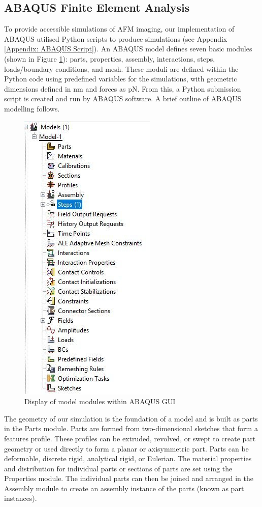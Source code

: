 \subsection{ABAQUS Finite Element Analysis}

To provide accessible simulations of AFM imaging, our implementation of ABAQUS utilised Python scripts to produce simulations (see Appendix \ref{Appendix: ABAQUS Script}). An ABAQUS model defines seven basic modules (shown in Figure \ref{fig: ABAQUS Modules}): parts, properties, assembly, interactions, steps, loads/boundary conditions, and mesh. These moduli are defined within the Python code using predefined variables for the simulations, with geometric dimensions defined in nm and forces as pN. From this, a Python submission script is created and run by ABAQUS software. A brief outline of ABAQUS modelling follows.

\begin{figure}[H]
    \centering
    \includegraphics[width=0.32\linewidth]{Figures/Abaqus Modules.jpg}
    \caption{Display of model modules within ABAQUS GUI}
    \label{fig: ABAQUS Modules}
\end{figure}

The geometry of our simulation is the foundation of a model and is built as parts in the Parts module. Parts are formed from two-dimensional sketches that form a features profile. These profiles can be extruded, revolved, or swept to create part geometry or used directly to form a planar or axisymmetric part. Parts can be deformable, discrete rigid, analytical rigid, or Eulerian. The material properties and distribution for individual parts or sections of parts are set using the Properties module. The individual parts can then be joined and arranged in the Assembly module to create an assembly instance of the parts (known as part instances). 

